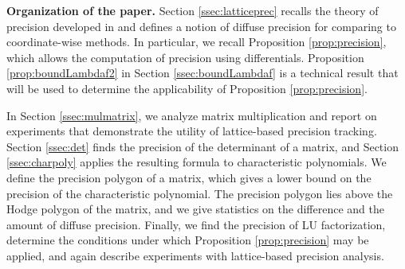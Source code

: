 \documentclass{sig-alternate}
\newcommand{\Q}{\mathbb Q}
\begin{document}
\begin{comment}
The present paper, which may be considered as a continuation of 
\cite{caruso-roe-vaccon:14a}, aims at using the theory of \emph{loc. 
cit.} in order to analyze the $p$-adic stability of many standard 
algorithms for computing with basic algebraic structures: numbers, 
matrices, univariate polynomials and vector spaces. For each considered 
algorithm, we will follow the same protocol: 
first, we will compute the theoretical loss of precision of the 
underlying question using the framework of \cite{caruso-roe-vaccon:14a} 
and then compare it to those observed in available implementations in 
\textsc{pari} \cite{pari}, \textsc{magma} \cite{magma} and/or 
\textsc{sage} \cite{sage}.

The conclusion of our analysis is that generic algorithms which are 
designed to work over an arbitrary field are often quite unstable. Very 
roughly, denoting by $D$ the number of divisions performed by the 
algorithm under analysis and by $q$ the cardinality of the residue 
field, it appears that the numbers of lost digits is about $O(\frac D 
q)$ whereas the theoretical loss of precision is closer than $O(\log_q 
D)$ --- and sometimes even $O(1)$. We would like to underline in 
particular that the instability phenomena are much more apparent when 
the residue field is small. It is the reason why we will always take
$K = \Q_2$ is our examples.
\end{comment}

\smallskip

\noindent
{\bf Organization of the paper.}
Section \ref{ssec:latticeprec} recalls the theory of 
precision developed in \cite{caruso-roe-vaccon:14a} and defines
a notion of diffuse precision for comparing to coordinate-wise methods.
In particular, we recall Proposition \ref{prop:precision}, which
allows the computation of precision using differentials.
Proposition \ref{prop:boundLambdaf2} in Section \ref{ssec:boundLambdaf}
is a technical result that will be used to determine the applicability of
Proposition \ref{prop:precision}.

In Section \ref{ssec:mulmatrix}, we analyze matrix multiplication and report
on experiments that demonstrate the utility of lattice-based precision tracking.
Section \ref{ssec:det} finds the precision of the determinant of a
matrix, and Section \ref{ssec:charpoly} applies the resulting formula to
characteristic polynomials.  We define the precision polygon of a matrix, which
gives a lower bound on the precision of the characteristic polynomial.
The precision polygon lies above the Hodge polygon of the matrix, and
we give statistics on the difference and the amount of diffuse precision.
Finally, we find the precision of LU factorization, determine the conditions under which
Proposition \ref{prop:precision} may be applied, and again describe experiments
with lattice-based precision analysis.
\end{document}
